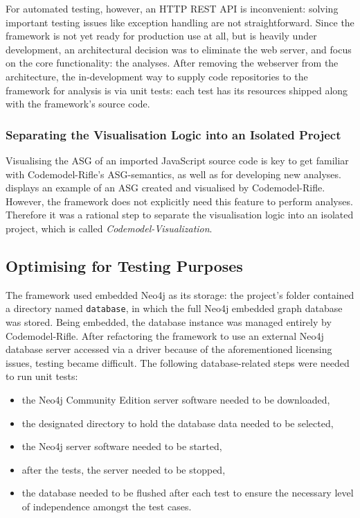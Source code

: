 For automated testing, however, an HTTP REST API is inconvenient: solving important testing issues like exception handling are not straightforward. Since the framework is not yet ready for production use at all, but is heavily under development, an architectural decision was to eliminate the web server, and focus on the core functionality: the analyses. After removing the webserver from the architecture, the in-development way to supply code repositories to the framework for analysis is via unit tests: each test has its resources shipped along with the framework's source code.


\subsubsection{Separating the Visualisation Logic into an Isolated Project}

Visualising the ASG of an imported JavaScript source code is key to get familiar with Codemodel-Rifle's ASG-semantics, as well as for developing new analyses.  displays an example of an ASG created and visualised by Codemodel-Rifle. However, the framework does not explicitly need this feature to perform analyses. Therefore it was a rational step to separate the visualisation logic into an isolated project, which is called \emph{Codemodel-Visualization}.


\subsection{Optimising for Testing Purposes}

The framework used embedded Neo4j as its storage: the project's folder contained a directory named \lstinline{database}, in which the full Neo4j embedded graph database was stored. Being embedded, the database instance was managed entirely by Codemodel-Rifle. After refactoring the framework to use an external Neo4j database server accessed via a driver because of the aforementioned licensing issues, testing became difficult. The following database-related steps were needed to run unit tests:

\begin{itemize}
\item the Neo4j Community Edition server software needed to be downloaded,
\item the designated directory to hold the database data needed to be selected,
\item the Neo4j server software needed to be started,
\item after the tests, the server needed to be stopped,
\item the database needed to be flushed after each test to ensure the necessary level of independence amongst the test cases.
\end{itemize}

